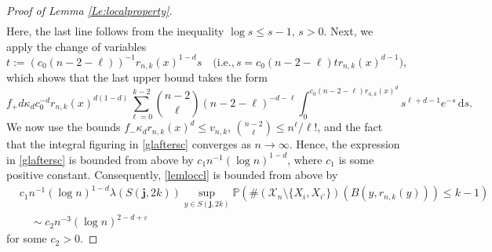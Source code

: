 \documentclass{article}
\theoremstyle{thm}
\theoremstyle{definition}
\theoremstyle{definition}
\theoremstyle{def}
\newcommand{\PP}{\mathbb{P}} %
\newcommand{\jj}{\mathbf{j}}
\begin{document}
\begin{proof}[Proof of Lemma \ref{Le:localproperty}]
\begin{align*}
	\end{align*}
	Here, the last line follows from the inequality $\log s \le s-1,\,s>0$. Next,  we apply the change of variables
	\[
	t:=(c_0(n-2-\ell))^{-1} r_{n,k}(x)^{1-d} s \quad \Big(\text{i.e.}, s=c_0(n-2-\ell) t r_{n,k}(x)^{d-1}\Big),
	\]
	which shows that the last upper bound takes the form
	\begin{equation}\label{glaftersc}
		f_+d \kappa_d {c_0^{-d}} r_{n,k}(x)^{d(1-d)} \sum_{\ell=0}^{k-2} \binom{n-2}{\ell} (n-2-\ell)^{-d-\ell} \int_0^{c_0 (n-2-\ell)r_{n,k}(x)^d} s^{\ell+d-1} e^{-s} \,\mathrm{d}s.
	\end{equation}
	We now use the bounds $f_- \kappa_d r_{n,k}(x)^d \le v_{n,k}$, $\binom{n-2}{\ell}\le n^{\ell}/\ell!$, and the fact that the integral figuring in
	\eqref{glaftersc} converges as $n \to \infty$. Hence, the expression in \eqref{glaftersc} is bounded from above by  $c_1 n^{-1} (\log n)^{1-d}$, where $c_1$ is some
	positive constant. Consequently,  \eqref{lemloccl} is bounded from above by
	\begin{align}
		&c_1 n^{-1}(\log n)^{1-d} \lambda(S(\jj,2k)) \sup_{y \in S(\jj,2k)} \PP(\#(\mathcal{X}_n \setminus \{X_i,X_{i'}\})(B(y,r_{n,k}(y)))\le k-1)\nonumber\\
		&\quad  \sim c_2 n^{-3} (\log n)^{2-d+\varepsilon} \label{lemlocclbou}
	\end{align}
 for some $c_2>0$.
	

\end{proof}
\end{document}
